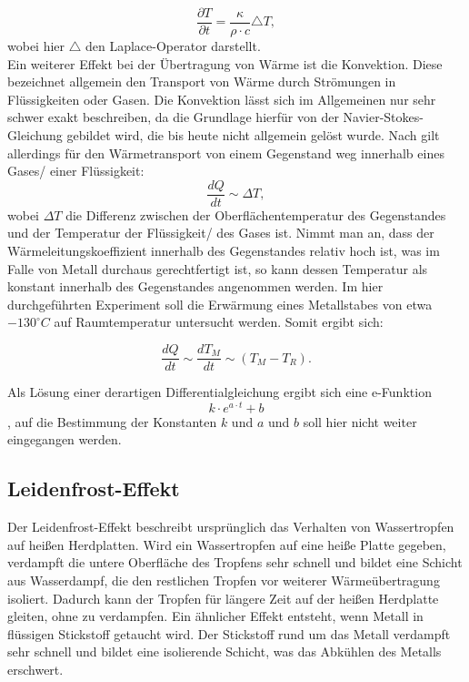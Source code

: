 \begin{equation}
\frac{\partial T}{\partial t} = \frac{\kappa}{\rho \cdot c} \triangle T, 
\label{form:leitung}
\end{equation}
wobei hier $\triangle$ den Laplace-Operator darstellt. 
\\
Ein weiterer Effekt bei der Übertragung von Wärme ist die Konvektion. Diese bezeichnet allgemein den Transport von Wärme durch Strömungen in Flüssigkeiten oder Gasen. Die Konvektion lässt sich im Allgemeinen nur sehr schwer exakt beschreiben, da die Grundlage hierfür von der Navier-Stokes-Gleichung gebildet wird, die bis heute nicht allgemein gelöst wurde. Nach \cite{praktikumwaerme} gilt allerdings für den Wärmetransport von einem Gegenstand weg innerhalb eines Gases/ einer Flüssigkeit: 
\begin{equation}
\frac{dQ}{dt} \sim \Delta T,
\end{equation}
wobei $\Delta T$ die Differenz zwischen der Oberflächentemperatur des Gegenstandes und der Temperatur der Flüssigkeit/ des Gases ist. 
Nimmt man an, dass der Wärmeleitungskoeffizient innerhalb des Gegenstandes relativ hoch ist, was im Falle von Metall durchaus gerechtfertigt ist, so kann dessen Temperatur als konstant innerhalb des Gegenstandes angenommen werden. 
Im hier durchgeführten Experiment soll die Erwärmung eines Metallstabes von etwa $ -130 ^{\circ} C $ auf Raumtemperatur untersucht werden. Somit ergibt sich: 

\begin{equation}
\frac{dQ}{dt} \sim  \frac{dT_M}{dt} \sim (T_{M} - T_{R}). 
\label{form:konvektion1}
\end{equation}

Als Lösung einer derartigen Differentialgleichung ergibt sich eine e-Funktion 
\begin{equation}
k \cdot e^{a \cdot t} + b
\label{form:konvektion2}
\end{equation}
, auf die Bestimmung der Konstanten $k$ und $a$ und $b$ soll hier nicht weiter eingegangen werden. 

\subsection{Leidenfrost-Effekt}
Der Leidenfrost-Effekt beschreibt ursprünglich das Verhalten von Wassertropfen auf heißen Herdplatten. Wird ein Wassertropfen auf eine heiße Platte gegeben, verdampft die untere Oberfläche des Tropfens sehr schnell und bildet eine Schicht aus Wasserdampf, die den restlichen Tropfen vor weiterer Wärmeübertragung isoliert. Dadurch kann der Tropfen für längere Zeit auf der heißen Herdplatte gleiten, ohne zu verdampfen.
Ein ähnlicher Effekt entsteht, wenn Metall in flüssigen Stickstoff getaucht wird. Der Stickstoff rund um das Metall verdampft sehr schnell und bildet eine isolierende Schicht, was das Abkühlen des Metalls erschwert.
